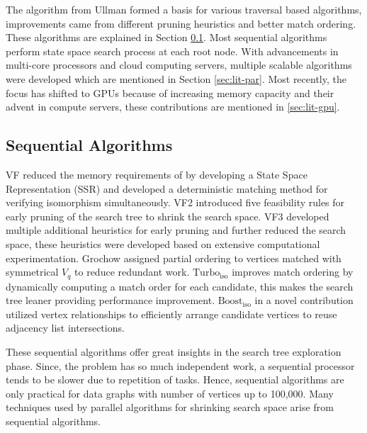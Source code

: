 The algorithm from Ullman \cite{ullman_sgm} formed a basis for various traversal based algorithms, improvements came from different pruning heuristics and better match ordering. These algorithms are explained in Section \ref{sec:lit-seq}.
Most sequential algorithms perform state space search process at each root node.
With advancements in multi-core processors and cloud computing servers, multiple scalable algorithms were developed which are mentioned in Section \ref{sec:lit-par}.
Most recently, the focus has shifted to GPUs because of increasing memory capacity and their advent in compute servers, these contributions are mentioned in \ref{sec:lit-gpu}.

\subsection{Sequential Algorithms} \label{sec:lit-seq}
VF \cite{VF} reduced the memory requirements of \cite{ullman_sgm} by developing a State Space Representation (SSR) and developed a deterministic matching method for verifying isomorphism simultaneously.
VF2 \cite{VF2} introduced five feasibility rules for early pruning of the search tree to shrink the search space.
VF3 \cite{VF3} developed multiple additional heuristics for early pruning and further reduced the search space, these heuristics were developed based on extensive computational experimentation.
Grochow \etal \cite{symbreak} assigned partial ordering to vertices matched with symmetrical $V_q$ to reduce redundant work.
$\text{Turbo}_{\text{iso}}$ \cite{Turbo-iso} improves match ordering by dynamically computing a match order for each candidate, this makes the search tree leaner providing performance improvement.
$\text{Boost}_{\text{iso}}$ \cite{Boost-iso} in a novel contribution utilized vertex relationships to efficiently arrange candidate vertices to reuse adjacency list intersections.

These sequential algorithms offer great insights in the search tree exploration phase.
Since, the problem has so much independent work, a sequential processor tends to be slower due to repetition of tasks.
Hence, sequential algorithms are only practical for data graphs with number of vertices up to 100,000.
Many techniques used by parallel algorithms for shrinking search space arise from sequential algorithms.

